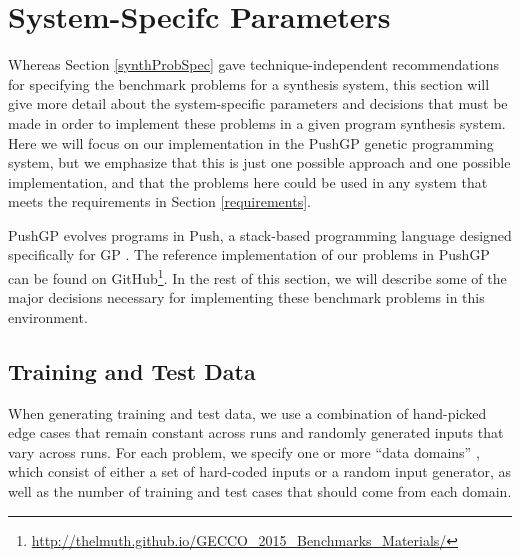 \documentclass{sig-alternate}
\begin{document}
\section{System-Specifc Parameters} \label{systemParamsSection}

Whereas Section \ref{synthProbSpec} gave technique-independent recommendations for specifying the benchmark problems for a synthesis system, this section will give more detail about the system-specific parameters and decisions that must be made in order to implement these problems in a given program synthesis system. Here we will focus on our implementation in the PushGP genetic programming system, but we emphasize that this is just one possible approach and one possible implementation, and that the problems here could be used in any system that meets the requirements in Section \ref{requirements}.

PushGP evolves programs in Push, a stack-based programming language designed specifically for GP \cite{spector:2002:GPEM, 1068292}. %
The reference implementation of our problems in PushGP can be found on GitHub\footnote{\url{http://thelmuth.github.io/GECCO_2015_Benchmarks_Materials/}}. In the rest of this section, we will describe some of the major decisions necessary for implementing these benchmark problems in this environment.

\subsection{Training and Test Data}

When generating training and test data, we use a combination of hand-picked edge cases that remain constant across runs and randomly generated inputs that vary across runs. For each problem, we specify one or more ``data domains'' \cite{Helmuth:2014:GECCO}, which consist of either a set of hard-coded inputs or a random input generator, as well as the number of training and test cases that should come from each domain. %
\end{document}
